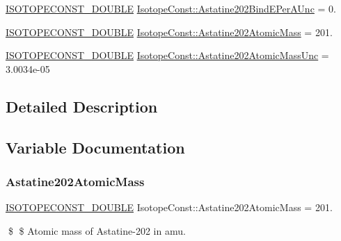 \begin{DoxyCompactItemize}
\mbox{\hyperlink{group___isotope_const-_macros_ga8f45a7272ce02c0b4c65c44636ed719a}{I\+S\+O\+T\+O\+P\+E\+C\+O\+N\+S\+T\+\_\+\+D\+O\+U\+B\+LE}} \mbox{\hyperlink{group___isotope_const-_astatine-_at202_ga377034bcde776a49ecfc9400985bcf43}{Isotope\+Const\+::\+Astatine202\+Bind\+E\+Per\+A\+Unc}} = 0.
\item 
\mbox{\hyperlink{group___isotope_const-_macros_ga8f45a7272ce02c0b4c65c44636ed719a}{I\+S\+O\+T\+O\+P\+E\+C\+O\+N\+S\+T\+\_\+\+D\+O\+U\+B\+LE}} \mbox{\hyperlink{group___isotope_const-_astatine-_at202_ga4f53a8cf8f2ca5b3830bccde987adaaa}{Isotope\+Const\+::\+Astatine202\+Atomic\+Mass}} = 201.
\item 
\mbox{\hyperlink{group___isotope_const-_macros_ga8f45a7272ce02c0b4c65c44636ed719a}{I\+S\+O\+T\+O\+P\+E\+C\+O\+N\+S\+T\+\_\+\+D\+O\+U\+B\+LE}} \mbox{\hyperlink{group___isotope_const-_astatine-_at202_gafd0bb793c2fb0597bbff3bf45ae79663}{Isotope\+Const\+::\+Astatine202\+Atomic\+Mass\+Unc}} = 3.\+0034e-\/05
\end{DoxyCompactItemize}


\subsection{Detailed Description}


\subsection{Variable Documentation}
\mbox{\label{group___isotope_const-_astatine-_at202_ga4f53a8cf8f2ca5b3830bccde987adaaa}} 
\subsubsection{\texorpdfstring{Astatine202\+Atomic\+Mass}{Astatine202AtomicMass}}
{\footnotesize\ttfamily \mbox{\hyperlink{group___isotope_const-_macros_ga8f45a7272ce02c0b4c65c44636ed719a}{I\+S\+O\+T\+O\+P\+E\+C\+O\+N\+S\+T\+\_\+\+D\+O\+U\+B\+LE}} Isotope\+Const\+::\+Astatine202\+Atomic\+Mass = 201.}

\$ \$ Atomic mass of Astatine-\/202 in amu. \mbox{\label{group___isotope_const-_astatine-_at202_gafd0bb793c2fb0597bbff3bf45ae79663}} 

